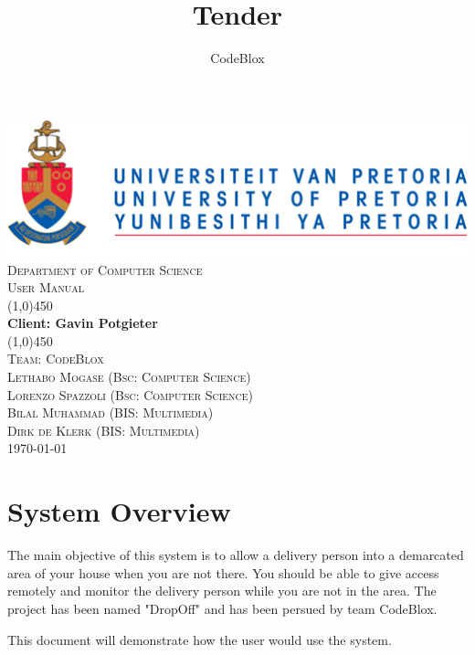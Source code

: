 \documentclass[a4paper,12pt]{article}
\author{CodeBlox}
\title{Tender}
\begin{document}
	\setlength{\parskip}{6pt}
	
	\begin{titlepage}
		\begin{center}
			\includegraphics[width=1\textwidth]{./Pictures/up_logo.png}\\[1.5cm] 
			\textsc{\LARGE Department of Computer Science} \\ [.5cm]
			\textsc{\Large User Manual} \\ [.5cm]
			\line(1,0){450}\\[.5cm]
			\huge{\bfseries Client: Gavin Potgieter}\\
			\line(1,0){450}\\[.5cm]
			\textsc{\LARGE Team: CodeBlox}\\ [0.5cm]
			
			
			\textsc{\large Lethabo Mogase (Bsc: Computer Science)}\\
			\textsc{\large Lorenzo Spazzoli (Bsc: Computer Science)}\\
			\textsc{\large Bilal Muhammad (BIS: Multimedia)}\\
			\textsc{\large Dirk de Klerk (BIS: Multimedia)}\\ [3.9cm]
			
			\large\today
		\end{center}
	\end{titlepage}
	
	\tableofcontents
	\thispagestyle{empty}
	\footnotesize
	\normalsize
	
	
	
	
	\newpage
	\section{System Overview}
	The main objective of this system is to allow a delivery person into a demarcated area of your house when you are not there. You should be able to give access remotely and monitor the delivery person while you are not in the area. 
	The project has been named "DropOff" and has been persued by team CodeBlox.
	
	This document will demonstrate how the user would use the system.
	
\end{document}
